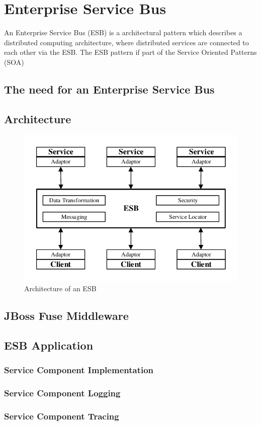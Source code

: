 \chapter{Enterprise Service Bus}
\label{cha:esb}
An Enterprise Service Bus (ESB) is a architectural pattern which describes a distributed computing architecture, where distributed services are connected to each other via the ESB. The ESB pattern if part of the Service Oriented Patterns (SOA)  

\section{The need for an Enterprise Service Bus}
\label{sec:esb-need-for-esb}

\section{Architecture}
\label{sec:esb-architecture}

\begin{figure}[htbp]
	\centering
	\includegraphics[scale=1]{images/esb-simple-architecture.pdf}
	\caption{Architecture of an ESB}
	\label{fig:esb-simple-architecture}
\end{figure} 

\section{JBoss Fuse Middleware}
\label{sec:esb-middleware}

\section{ESB Application}
\label{sec:esb-liwest-esb}

\subsection{Service Component Implementation}
\label{sec:esb-liwest-esb-impl}

\subsection{Service Component Logging}
\label{sec:esb-liwest-esb-logging}

\subsection{Service Component Tracing}
\label{sec:esb-liwest-esb-tracing}